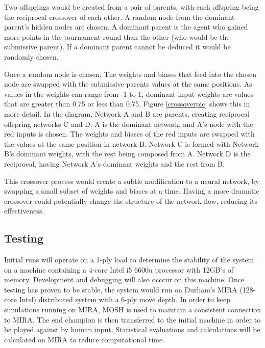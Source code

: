 \documentclass[12pt,a4paper]{article}
\begin{document}
            Two offsprings would be created from a pair of parents, with each offspring being the reciprocal crossover of each other. 
            A random node from the dominant parent's hidden nodes are chosen. A dominant parent is the agent who gained more points in the tournament round than the other (who would be the submissive parent). If a dominant parent cannot be deduced it would be randomly chosen. 
            
            Once a random node is chosen, The weights and biases that feed into the chosen node are swapped with the submissive parents values at the same positions. As values in the weights can range from -1 to 1, dominant input weights are values that are greater than 0.75 or less than 0.75. 
            Figure \ref{crossoverpic} shows this in more detail. In the diagram, Network A and B are parents, creating reciprocal offspring networks C and D. A is the dominant network, and A's node with the red inputs is chosen. The weights and biases of the red inputs are swapped with the values at the same position in network B. Network C is formed with Network B's dominant weights, with the rest being composed from A. Network D is the reciprocal, having Network A's dominant weights and the rest from B.

            This crossover process would create a subtle modification to a neural network, by swapping a small subset of weights and biases at a time. Having a more dramatic crossover could potentially change the structure of the network flow, reducing its effectiveness.

    \subsection{Testing}
        Initial runs will operate on a 1-ply load to determine the stability of the system on a machine containing a 4-core Intel i5 6600u processor with 12GB's of memory. Development and debugging will also occcur on this machine. Once testing has proven to be stable, the system would run on Durham's MIRA (128-core Intel) distributed system with a 6-ply move depth. In order to keep simulations running on MIRA, MOSH is used to maintain a consistent connection to MIRA. The end champion is then transferred to the initial machine in order to be played against by human input. Statistical evaluations and calculations will be calculated on MIRA to reduce computational time.
\end{document}
